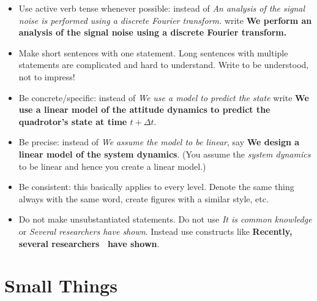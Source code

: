 \begin{itemize}
	\item Use active verb tense whenever possible: instead of \emph{An analysis of the signal noise is performed using a discrete Fourier transform.} write \textbf{We perform an analysis of the signal noise using a discrete Fourier transform.}
	\item Make short sentences with one statement. 
	Long sentences with multiple statements are complicated and hard to understand. 
	Write to be understood, not to impress!
	\item Be concrete/specific: instead of \emph{We use a model to predict the state} write \textbf{We use a linear model of the attitude dynamics to predict the quadrotor's state at time $t + \Delta t$}.
	\item Be precise: instead of \emph{We assume the model to be linear}, say \textbf{We design a linear model of the system dynamics}. (You assume the \emph{system dynamics} to be linear and hence you create a linear model.)
	\item Be consistent: this basically applies to every level. Denote the same thing always with the same word, create figures with a similar style, etc.
	\item Do not make unsubstantiated statements.
	Do not use \emph{It is common knowledge} or \emph{Several researchers have shown}.
	Instead use constructs like \textbf{Recently, several researchers~\cite{KleinMurray2007,Strasdat2010WhyFilter} have shown}.
\end{itemize}

\section{Small Things}

